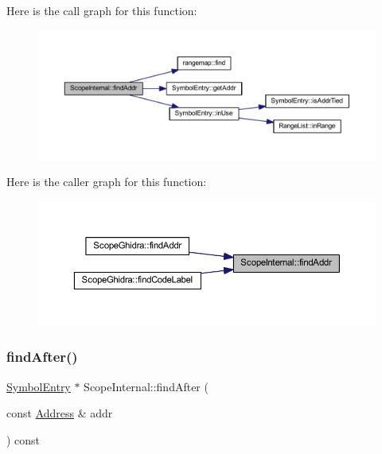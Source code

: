 Here is the call graph for this function\+:
\nopagebreak
\begin{figure}[H]
\begin{center}
\leavevmode
\includegraphics[width=350pt]{class_scope_internal_ac256d087718065edb1c3a96fbfdf7a33_cgraph}
\end{center}
\end{figure}
Here is the caller graph for this function\+:
\nopagebreak
\begin{figure}[H]
\begin{center}
\leavevmode
\includegraphics[width=350pt]{class_scope_internal_ac256d087718065edb1c3a96fbfdf7a33_icgraph}
\end{center}
\end{figure}
\mbox{\label{class_scope_internal_a922323cc754778858646c2bb82b69e17}} 
\subsubsection{\texorpdfstring{findAfter()}{findAfter()}}
{\footnotesize\ttfamily \mbox{\hyperlink{class_symbol_entry}{Symbol\+Entry}} $\ast$ Scope\+Internal\+::find\+After (\begin{DoxyParamCaption}\item[{const \mbox{\hyperlink{class_address}{Address}} \&}]{addr }\end{DoxyParamCaption}) const\hspace{0.3cm}{\ttfamily [virtual]}}



